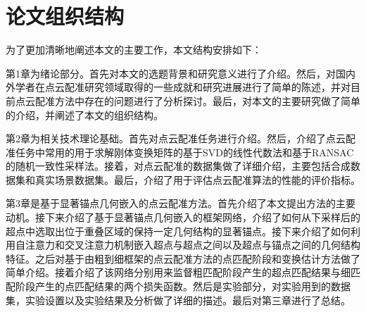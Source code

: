 

\section{论文组织结构}
为了更加清晰地阐述本文的主要工作，本文结构安排如下：

第1章为绪论部分。首先对本文的选题背景和研究意义进行了介绍。然后，对国内外学者在点云配准研究领域取得的一些成就和研究进展进行了简单的陈述，并对目前点云配准方法中存在的问题进行了分析探讨。最后，对本文的主要研究做了简单的介绍，并阐述了本文的组织结构。

第2章为相关技术理论基础。首先对点云配准任务进行介绍。然后，介绍了点云配准任务中常用的用于求解刚体变换矩阵的基于SVD的线性代数法和基于RANSAC的随机一致性采样法。接着，对点云配准的数据集做了详细介绍，主要包括合成数据集和真实场景数据集。最后，介绍了用于评估点云配准算法的性能的评价指标。

第3章是基于显著锚点几何嵌入的点云配准方法。首先介绍了本文提出方法的主要动机。接下来介绍了基于显著锚点几何嵌入的框架网络，介绍了如何从下采样后的超点中选取出位于重叠区域的保持一定几何结构的显著锚点。接下来介绍了如何利用自注意力和交叉注意力机制嵌入超点与超点之间以及超点与锚点之间的几何结构特征。之后对基于由粗到细框架的点云配准方法的点匹配阶段和变换估计方法做了简单介绍。接着介绍了该网络分别用来监督粗匹配阶段产生的超点匹配结果与细匹配阶段产生的点匹配结果的两个损失函数。然后是实验部分，对实验用到的数据集，实验设置以及实验结果及分析做了详细的描述。最后对第三章进行了总结。

